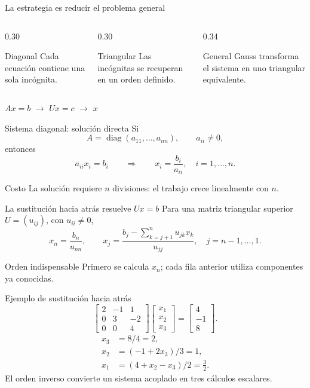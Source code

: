 \documentclass[aspectratio=169,12pt]{beamer}
\newcommand{\mat}[1]{\begin{bmatrix}#1\end{bmatrix}}
\begin{document}
\begin{frame}{La estrategia es reducir el problema general}
\begin{columns}[T,onlytextwidth]
\begin{column}{0.30\textwidth}
\begin{block}{Diagonal}
Cada ecuación contiene una sola incógnita.
\end{block}
\end{column}
\begin{column}{0.30\textwidth}
\begin{block}{Triangular}
Las incógnitas se recuperan en un orden definido.
\end{block}
\end{column}
\begin{column}{0.34\textwidth}
\begin{block}{General}
Gauss transforma el sistema en uno triangular equivalente.
\end{block}
\end{column}
\end{columns}
\vspace{0.55cm}
\centering
$Ax=b$ \quad $\longrightarrow$ \quad $Ux=c$ \quad $\longrightarrow$ \quad $x$
\end{frame}

\begin{frame}{Sistema diagonal: solución directa}
Si
\[
A=\operatorname{diag}(a_{11},\ldots,a_{nn}),
\qquad a_{ii}\neq0,
\]
entonces
\[
a_{ii}x_i=b_i
\qquad\Longrightarrow\qquad
x_i=\frac{b_i}{a_{ii}},\quad i=1,\ldots,n.
\]
\begin{block}{Costo}
La solución requiere $n$ divisiones: el trabajo crece linealmente con $n$.
\end{block}
\end{frame}

\begin{frame}{La sustitución hacia atrás resuelve $Ux=b$}
Para una matriz triangular superior $U=(u_{ij})$, con $u_{ii}\neq0$,
\[
x_n=\frac{b_n}{u_{nn}},
\qquad
x_j=\frac{b_j-\displaystyle\sum_{k=j+1}^{n}u_{jk}x_k}{u_{jj}},
\quad j=n-1,\ldots,1.
\]
\begin{block}{Orden indispensable}
Primero se calcula $x_n$; cada fila anterior utiliza componentes ya conocidas.
\end{block}
\end{frame}

\begin{frame}{Ejemplo de sustitución hacia atrás}
\[
\mat{2&-1&1\\0&3&-2\\0&0&4}
\mat{x_1\\x_2\\x_3}
=
\mat{4\\-1\\8}.
\]
\begin{align*}
x_3&=8/4=2,\\
x_2&=(-1+2x_3)/3=1,\\
x_1&=(4+x_2-x_3)/2=\tfrac32.
\end{align*}
\centering
El orden inverso convierte un sistema acoplado en tres cálculos escalares.
\end{frame}
\end{document}
